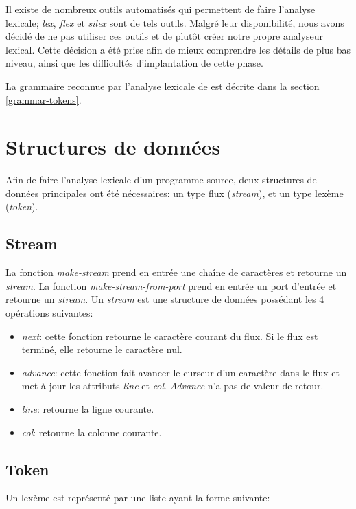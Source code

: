 \documentclass[11pt]{report}
\begin{document}
Il existe de nombreux outils automatisés qui permettent de faire
l'analyse lexicale; \emph{lex}, \emph{flex} et \emph{silex} sont de
tels outils.  Malgré leur disponibilité, nous avons décidé de ne pas
utiliser ces outils et de plutôt créer notre propre analyseur lexical.
Cette décision a été prise afin de mieux comprendre les détails de
plus bas niveau, ainsi que les difficultés d'implantation de cette
phase.

La grammaire reconnue par l'analyse lexicale de \sins{} est décrite
dans la section \ref{grammar-tokens}.

\section{Structures de données}

Afin de faire l'analyse lexicale d'un programme source, deux
structures de données principales ont été nécessaires: un type flux
(\emph{stream}), et un type lexème (\emph{token}).

\subsection{Stream}

La fonction \emph{make-stream} prend en entrée une chaîne de
caractères et retourne un \emph{stream}.  La fonction
\emph{make-stream-from-port} prend en entrée un port d'entrée et
retourne un \emph{stream}.  Un \emph{stream} est une structure de
données possédant les 4 opérations suivantes:

\begin{itemize}
\item \emph{next}: cette fonction retourne le caractère courant du
  flux.  Si le flux est terminé, elle retourne le caractère nul.
\item \emph{advance}: cette fonction fait avancer le curseur d'un
  caractère dans le flux et met à jour les attributs \emph{line} et
  \emph{col}.  \emph{Advance} n'a pas de valeur de retour.
\item \emph{line}: retourne la ligne courante.
\item \emph{col}: retourne la colonne courante.
\end{itemize}


\subsection{Token}

Un lexème est représenté par une liste ayant la forme suivante:
\end{document}
